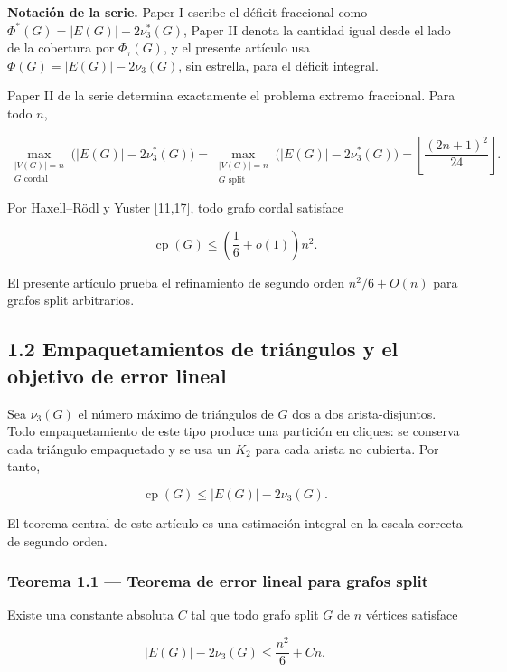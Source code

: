 \documentclass[
  spanish,
  11pt,
  a4paper,
]{article}
\begin{document}
\textbf{Notación de la serie.} Paper I escribe el déficit fraccional como \(\Phi^*(G)=|E(G)|-2\nu_3^*(G)\), Paper II denota la cantidad igual desde el lado de la cobertura por \(\Phi_\tau(G)\), y el presente artículo usa \(\Phi(G)=|E(G)|-2\nu_3(G)\), sin estrella, para el déficit integral.

Paper II de la serie determina exactamente el problema extremo fraccional. Para todo \(n\),

\[
\max_{\substack{|V(G)|=n\\G\text{ cordal}}}
\bigl(|E(G)|-2\nu_3^*(G)\bigr)
=
\max_{\substack{|V(G)|=n\\G\text{ split}}}
\bigl(|E(G)|-2\nu_3^*(G)\bigr)
=
\left\lfloor\frac{(2n+1)^2}{24}\right\rfloor.
\]

Por Haxell--Rödl y Yuster {[}11,17{]}, todo grafo cordal satisface

\[
\operatorname{cp}(G)
\le
\left(\frac16+o(1)\right)n^2.
\]

El presente artículo prueba el refinamiento de segundo orden \(n^2/6+O(n)\) para grafos split arbitrarios.

\subsection{1.2 Empaquetamientos de triángulos y el objetivo de error lineal}\label{empaquetamientos-de-triuxe1ngulos-y-el-objetivo-de-error-lineal}

Sea \(\nu_3(G)\) el número máximo de triángulos de \(G\) dos a dos arista-disjuntos. Todo empaquetamiento de este tipo produce una partición en cliques: se conserva cada triángulo empaquetado y se usa un \(K_2\) para cada arista no cubierta. Por tanto,

\[
\operatorname{cp}(G)
\le
|E(G)|-2\nu_3(G).
\tag{1.1}
\]

El teorema central de este artículo es una estimación integral en la escala correcta de segundo orden.

\subsubsection{Teorema 1.1 --- Teorema de error lineal para grafos split}\label{teorema-1.1-teorema-de-error-lineal-para-grafos-split}

Existe una constante absoluta \(C\) tal que todo grafo split \(G\) de \(n\) vértices satisface

\[
\boxed{
|E(G)|-2\nu_3(G)
\le
\frac{n^2}{6}+Cn.
}
\tag{1.2}
\]
\end{document}
